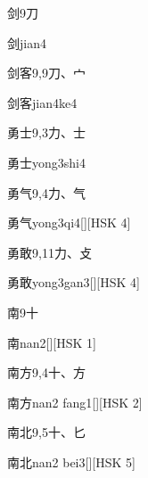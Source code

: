 \begin{entry}{剑}{9}{⼑}
  \begin{phonetics}{剑}{jian4}
  \end{phonetics}
\end{entry}

\begin{entry}{剑客}{9,9}{⼑、⼧}
  \begin{phonetics}{剑客}{jian4ke4}
  \end{phonetics}
\end{entry}

\begin{entry}{勇士}{9,3}{⼒、⼠}
  \begin{phonetics}{勇士}{yong3shi4}
  \end{phonetics}
\end{entry}

\begin{entry}{勇气}{9,4}{⼒、⽓}
  \begin{phonetics}{勇气}{yong3qi4}[][HSK 4]
  \end{phonetics}
\end{entry}

\begin{entry}{勇敢}{9,11}{⼒、⽁}
  \begin{phonetics}{勇敢}{yong3gan3}[][HSK 4]
  \end{phonetics}
\end{entry}

\begin{entry}{南}{9}{⼗}
  \begin{phonetics}{南}{nan2}[][HSK 1]
  \end{phonetics}
\end{entry}

\begin{entry}{南方}{9,4}{⼗、⽅}
  \begin{phonetics}{南方}{nan2 fang1}[][HSK 2]
  \end{phonetics}
\end{entry}

\begin{entry}{南北}{9,5}{⼗、⼔}
  \begin{phonetics}{南北}{nan2 bei3}[][HSK 5]
  \end{phonetics}
\end{entry}

